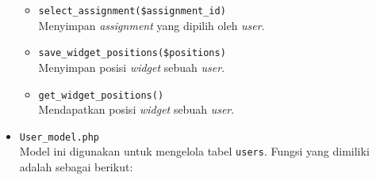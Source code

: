 \begin{itemize}
            \begin{itemize}
                  \item \verb|select_assignment($assignment_id)| \\
                        Menyimpan \textit{assignment} yang dipilih oleh \textit{user}.
                  \item \verb|save_widget_positions($positions)| \\
                        Menyimpan posisi \textit{widget} sebuah \textit{user}.
                  \item \verb|get_widget_positions()| \\
                        Mendapatkan posisi \textit{widget} sebuah \textit{user}.
            \end{itemize}

      \item \verb|User_model.php| \\
            Model ini digunakan untuk mengelola tabel \verb|users|. Fungsi yang dimiliki adalah sebagai berikut:


\end{itemize}
